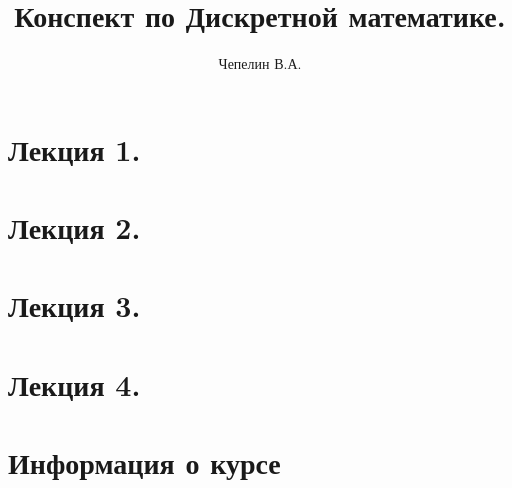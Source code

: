 \documentclass{article}
\title{Конспект по Дискретной математике.}
\author{Чепелин В.А.}
\date{ }
\begin{document}
\maketitle
\tableofcontents

\newpage
\section{Лекция 1.}


\newpage
\section{Лекция 2.}


\newpage
\section{Лекция 3.}


\newpage
\section{Лекция 4.}


\newpage
\section{Информация о курсе}

\end{document}
